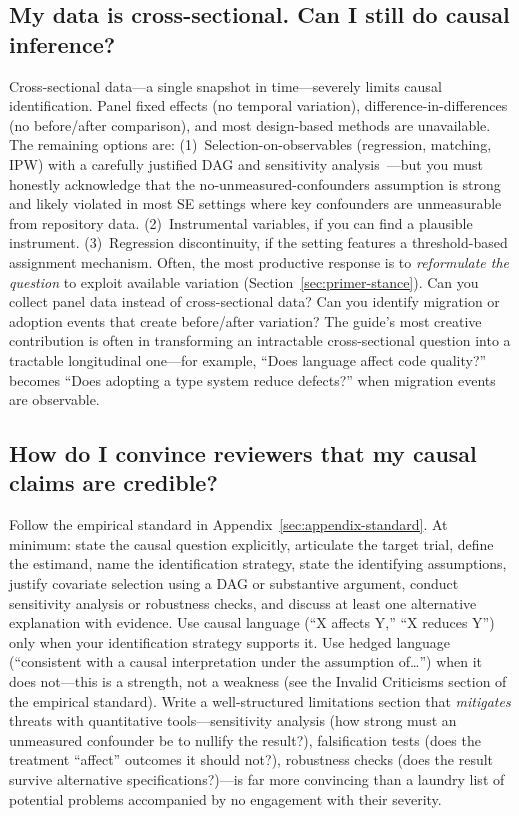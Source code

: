 \subsection{My data is cross-sectional. Can I still do causal inference?}

Cross-sectional data---a single snapshot in time---severely limits causal identification.
Panel fixed effects (no temporal variation), difference-in-differences (no before/after comparison), and most design-based methods are unavailable.
The remaining options are:
(1)~Selection-on-observables (regression, matching, IPW) with a carefully justified DAG and sensitivity analysis~\cite{cinelli2020making}---but you must honestly acknowledge that the no-unmeasured-confounders assumption is strong and likely violated in most SE settings where key confounders are unmeasurable from repository data.
(2)~Instrumental variables, if you can find a plausible instrument.
(3)~Regression discontinuity, if the setting features a threshold-based assignment mechanism.
Often, the most productive response is to \emph{reformulate the question} to exploit available variation (Section~\ref{sec:primer-stance}).
Can you collect panel data instead of cross-sectional data?
Can you identify migration or adoption events that create before/after variation?
The guide's most creative contribution is often in transforming an intractable cross-sectional question into a tractable longitudinal one---for example, ``Does language affect code quality?'' becomes ``Does adopting a type system reduce defects?'' when migration events are observable.

\subsection{How do I convince reviewers that my causal claims are credible?}

Follow the empirical standard in Appendix~\ref{sec:appendix-standard}.
At minimum: state the causal question explicitly, articulate the target trial, define the estimand, name the identification strategy, state the identifying assumptions, justify covariate selection using a DAG or substantive argument, conduct sensitivity analysis or robustness checks, and discuss at least one alternative explanation with evidence.
Use causal language (``X affects Y,'' ``X reduces Y'') only when your identification strategy supports it.
Use hedged language (``consistent with a causal interpretation under the assumption of\ldots'') when it does not---this is a strength, not a weakness (see the Invalid Criticisms section of the empirical standard).
Write a well-structured limitations section that \emph{mitigates} threats with quantitative tools---sensitivity analysis (how strong must an unmeasured confounder be to nullify the result?), falsification tests (does the treatment ``affect'' outcomes it should not?), robustness checks (does the result survive alternative specifications?)---is far more convincing than a laundry list of potential problems accompanied by no engagement with their severity.

